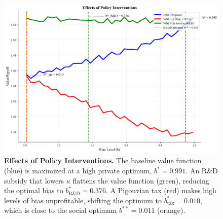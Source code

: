 \begin{figure}[H]
    \centering
    \includegraphics[width=1\textwidth]{../figures/figure_2_policy_interventions.png}
    \caption[Effects of Policy Interventions]{\textbf{Effects of Policy Interventions.} The baseline value function (blue) is maximized at a high private optimum, $b^*=0.991$. An R\&D subsidy that lowers $\kappa$ flattens the value function (green), reducing the optimal bias to $b^*_{\text{R\&D}}=0.376$. A Pigouvian tax (red) makes high levels of bias unprofitable, shifting the optimum to $b^*_{\text{tax}}=0.010$, which is close to the social optimum $b^{**}=0.011$ (orange).}
    \label{fig:policy}
\end{figure}